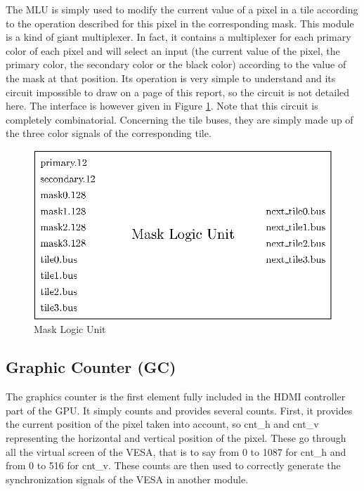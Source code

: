 The MLU is simply used to modify the current value of a pixel in a tile according to the operation 
described for this pixel in the corresponding mask. This module is a kind of giant multiplexer. In 
fact, it contains a multiplexer for each primary color of each pixel and will select an input 
(the current value of the pixel, the primary color, the secondary color or the black color) 
according to the value of the mask at that position. Its operation is very simple to understand 
and its circuit impossible to draw on a page of this report, so the circuit is not detailed here. The interface is however given in Figure \ref{fig:gpu/mlu}.
Note that this circuit is completely combinatorial. Concerning the tile buses, they are simply
made up of the three color signals of the corresponding tile.

\begin{figure}[H]
    \centering
    \includegraphics[scale=1.0]{Chapter4-GPU_CLKU/res/mlu}
    \caption{Mask Logic Unit}
    \label{fig:gpu/mlu}
\end{figure}

\subsection{Graphic Counter (GC)}

The graphics counter is the first element fully included in the HDMI controller part of the GPU. 
It simply counts and provides several counts. First, it provides the current position of the 
pixel taken into account, so cnt\_h and cnt\_v representing the horizontal and vertical position 
of the pixel. These go through all the virtual screen of the VESA, that is to say from 0 to 1087 
for cnt\_h and from 0 to 516 for cnt\_v. These counts are then used to correctly generate the 
synchronization signals of the VESA in another module. 

